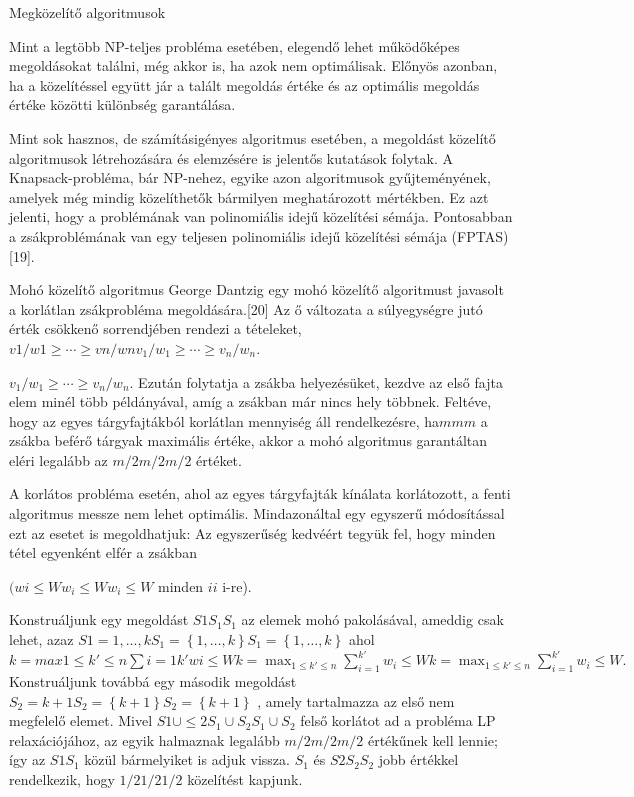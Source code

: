 	Megközelítő algoritmusok
	
	Mint a legtöbb NP-teljes probléma esetében, elegendő lehet működőképes megoldásokat találni, még akkor is, ha azok nem optimálisak. Előnyös azonban, ha a közelítéssel együtt jár a talált megoldás értéke és az optimális megoldás értéke közötti különbség garantálása.
	
	Mint sok hasznos, de számításigényes algoritmus esetében, a megoldást közelítő algoritmusok létrehozására és elemzésére is jelentős kutatások folytak. A Knapsack-probléma, bár NP-nehez, egyike azon algoritmusok gyűjteményének, amelyek még mindig közelíthetők bármilyen meghatározott mértékben. Ez azt jelenti, hogy a problémának van polinomiális idejű közelítési sémája. Pontosabban a zsákproblémának van egy teljesen polinomiális idejű közelítési sémája (FPTAS)[19]. 
	
	
	Mohó közelítő algoritmus
	George Dantzig egy mohó közelítő algoritmust javasolt a korlátlan zsákprobléma megoldására.[20] Az ő változata a súlyegységre jutó érték csökkenő sorrendjében rendezi a tételeket, 
	$v 1 / w 1 \geq \cdots \geq v n / w n {\displaystyle v_{1}/w_{1}\geq \cdots \geq v_{n}/w_{n}}$. 
	
	${\displaystyle v_{1}/w_{1}\geq \cdots \geq v_{n}/w_{n}}$. Ezután folytatja a zsákba helyezésüket, kezdve az első fajta elem minél több példányával, amíg a zsákban már nincs hely többnek. Feltéve, hogy az egyes tárgyfajtákból korlátlan mennyiség áll rendelkezésre, ha$ m {\displaystyle m} m$ a zsákba beférő tárgyak maximális értéke, akkor a mohó algoritmus garantáltan eléri legalább az $m/2 {\displaystyle m/2} m/2$ értéket.
	
	A korlátos probléma esetén, ahol az egyes tárgyfajták kínálata korlátozott, a fenti algoritmus messze nem lehet optimális. Mindazonáltal egy egyszerű módosítással ezt az esetet is megoldhatjuk: Az egyszerűség kedvéért tegyük fel, hogy minden tétel egyenként elfér a zsákban 
	
	$( w i \leq W {\displaystyle w_{i}\leq W} {\displaystyle w_{i}\leq W}$ 
	minden $i {\displaystyle i}$ i-re). 
	
	Konstruáljunk egy megoldást 
	$S 1 {\displaystyle S_{1}} S_{1}$
	az elemek mohó pakolásával, ameddig csak lehet, azaz 
	$S 1 = { 1 , ... , k } {\displaystyle S_{1}=\left\{1,\ldots ,k\right\}} {\displaystyle S_{1}=\left\{1,\ldots ,k\right\}}$
	ahol 
	$k = max 1 \leq k' \leq n \sum i = 1 k' w i \leq W {\displaystyle k=\textstyle \max _{1\leq k'\leq n}\textstyle \sum _{i=1}^{k'}w_{i}\leq W} {\displaystyle k=\textstyle \max _{1\leq k'\leq n}\textstyle \sum _{i=1}^{k'}w_{i}\leq W}.$
	Konstruáljunk továbbá egy második megoldást 
	$S_2 = {k + 1} {\displaystyle S_{2}}=\left\{k+1\right\} {\displaystyle S_{2}=\left\{k+1\right\}}$
	, amely tartalmazza az első nem megfelelő elemet. Mivel 
	$S 1 \cup \leq 2 {\displaystyle S_{1}\cup S_{2}} {\displaystyle S_{1}\cup S_{2}}$
	felső korlátot ad a probléma LP relaxációjához, az egyik halmaznak legalább 
	$m/2 {\displaystyle m/2} m/2$ értékűnek kell lennie; így az 
	$S 1 {\displaystyle S_{1}}$ közül bármelyiket is adjuk vissza. 
	$S_{1}$ és $S 2 {\displaystyle S_{2}} S_{2}$ jobb értékkel rendelkezik, hogy 
	$1 / 2 {\displaystyle 1/2} 1/2$ közelítést kapjunk.
	
